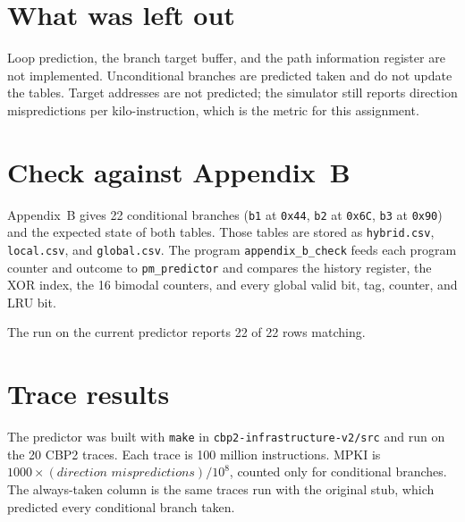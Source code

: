\documentclass[11pt]{article}
\begin{document}
\section{What was left out}

Loop prediction, the branch target buffer, and the path information register
are not implemented. Unconditional branches are predicted taken and do not
update the tables. Target addresses are not predicted; the simulator still
reports direction mispredictions per kilo-instruction, which is the metric
for this assignment.

\section{Check against Appendix~B}

Appendix~B gives 22 conditional branches (\texttt{b1} at \texttt{0x44},
\texttt{b2} at \texttt{0x6C}, \texttt{b3} at \texttt{0x90}) and the expected
state of both tables. Those tables are stored as \texttt{hybrid.csv}, \texttt{local.csv}, and
\texttt{global.csv}. The program
\texttt{appendix\_b\_check} feeds each program counter and outcome to
\texttt{pm\_predictor} and compares the history register, the XOR index, the
16 bimodal counters, and every global valid bit, tag, counter, and LRU bit.

The run on the current predictor reports 22 of 22 rows matching.

\section{Trace results}

The predictor was built with \texttt{make} in
\texttt{cbp2-infrastructure-v2/src} and run on the 20 CBP2 traces. Each trace
is 100 million instructions. MPKI is \(1000 \times (\textit{direction
mispredictions}) / 10^{8}\), counted only for conditional branches. The
always-taken column is the same traces run with the original stub, which
predicted every conditional branch taken.
\end{document}
